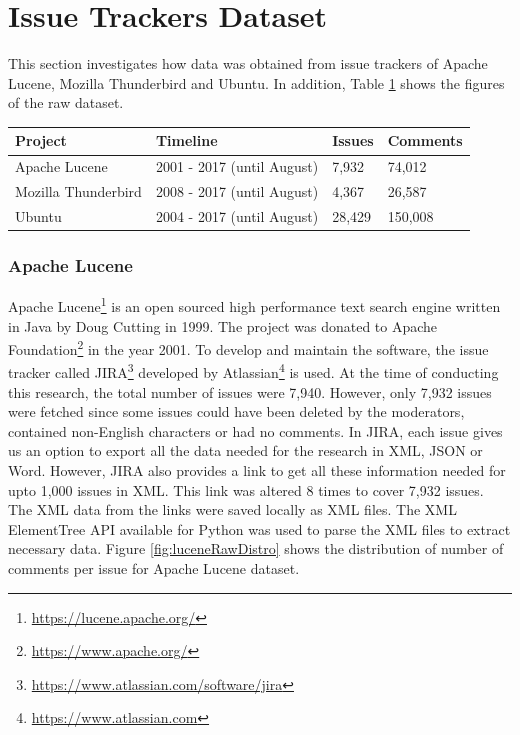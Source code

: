 \documentclass[a4paper,12pt,twoside]{report}
\begin{document}
\section{Issue Trackers Dataset}
This section investigates how data was obtained from issue trackers of Apache Lucene, Mozilla Thunderbird and Ubuntu. In addition, Table \ref{tab:rawIssueTrackers} shows the figures of the raw dataset. 

\begin{table} %
    \centering
    \begin{adjustbox}{max width=\columnwidth}
    \def\arraystretch{1} %
    \begin{tabular}{p{4cm} p{5cm} p{2cm} p{3cm}}
        \toprule
        \textbf{Project} & \textbf{Timeline} & \textbf{Issues} & \textbf{Comments}\\
        \midrule
			Apache Lucene & 2001 - 2017 (until August) & 7,932 & 74,012\\
			Mozilla Thunderbird & 2008 - 2017 (until August) & 4,367 & 26,587\\ 
			Ubuntu & 2004 - 2017 (until August) & 28,429 & 150,008\\
        \midrule
    \end{tabular}
    \end{adjustbox}
    \label{tab:rawIssueTrackers}
\end{table}

\subsubsection{Apache Lucene}
Apache Lucene\footnote{\url{https://lucene.apache.org/}} is an open sourced high performance text search engine written in Java by Doug Cutting in 1999. The project was donated to Apache Foundation\footnote{\url{https://www.apache.org/}} in the year 2001. To develop and maintain the software, the issue tracker called JIRA\footnote{\url{https://www.atlassian.com/software/jira}} developed by Atlassian\footnote{\url{https://www.atlassian.com}} is used. At the time of conducting this research, the total number of issues were 7,940. However, only 7,932 issues were fetched since some issues could have been deleted by the moderators, contained non-English characters or had no comments.
\newline \newline
In JIRA, each issue gives us an option to export all the data needed for the research in XML, JSON or Word. However, JIRA also provides a link to get all these information needed for upto 1,000 issues in XML. This link was altered 8 times to cover 7,932 issues. The XML data from the links were saved locally as XML files. The XML ElementTree API available for Python was used to parse the XML files to extract necessary data. Figure \ref{fig:luceneRawDistro} shows the distribution of number of comments per issue for Apache Lucene dataset. 
\end{document}
